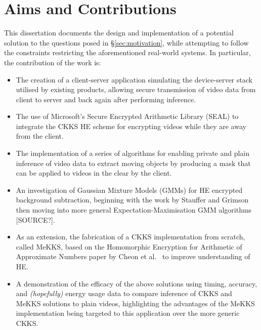 \setlength{\leftskip}{0cm}


\section{Aims and Contributions}
\label{sec:aimsAndContributions}
\setlength{\leftskip}{0.25cm}
\indent \indent
This dissertation documents the design and implementation of a potential solution to the questions posed in §\ref{sec:motivation}, while attempting to follow the constraints restricting the aforementioned real-world systems. In particular, the contribution of the work is:
\begin{itemize}
    \item The creation of a client-server application simulating the device-server stack utilised by existing products, allowing secure transmission of video data from client to server and back again after performing inference.
    \item The use of Microsoft's Secure Encrypted Arithmetic Library (SEAL) \cite{SEAL} to integrate the CKKS HE scheme \cite{CKKS} for encrypting videos while they are away from the client.
    \item The implementation of a series of algorithms for enabling private and plain inference of video data to extract moving objects by producing a mask that can be applied to videos in the clear by the client.
    \item An investigation of Gaussian Mixture Models (GMMs) for HE encrypted background subtraction, beginning with the work by Stauffer and Grimson \cite{Stauffer} then moving into more general Expectation-Maximisation GMM algorithms [SOURCE?].
    \item As an extension, the fabrication of a CKKS implementation from scratch, called MeKKS, based on the Homomorphic Encryption for Arithmetic of Approximate Numbers paper by Cheon et al.\ \cite{CKKS,BootstrappingHEAAN} to improve understanding of HE.
    \item A demonstration of the efficacy of the above solutions using timing, accuracy, and \textit{(hopefully)} energy usage data to compare inference of CKKS and MeKKS solutions to plain videos, highlighting the advantages of the MeKKS implementation being targeted to this application over the more generic CKKS.
\end{itemize}

\setlength{\leftskip}{0cm}
